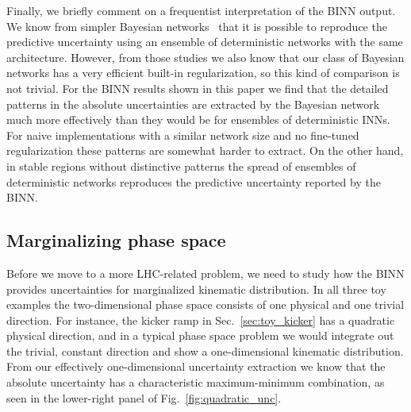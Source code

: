 Finally, we briefly comment on a frequentist interpretation of the
BINN output. We know from simpler Bayesian networks~\cite{Bollweg:2019skg,Kasieczka:2020vlh}
that it is possible to reproduce the predictive uncertainty using
an ensemble of deterministic networks with the same architecture.
However, from those studies we also know that our class of Bayesian
networks has a very efficient built-in regularization, so
this kind of comparison is not trivial. For the BINN results shown
in this paper we find that the detailed patterns in the
absolute uncertainties are extracted by the Bayesian network much more
effectively than they would be for ensembles of deterministic INNs.
For naive implementations with a similar network size and no fine-tuned
regularization these patterns are somewhat harder to extract. On the
other hand, in stable regions without distinctive patterns
the spread of ensembles of deterministic networks
reproduces the predictive uncertainty reported by the BINN.

\subsection{Marginalizing phase space}
\label{sec:toy_marginal}

Before we move to a more LHC-related problem, we need to study how the
BINN provides uncertainties for marginalized kinematic
distribution. In all three toy examples the two-dimensional phase
space consists of one physical and one trivial direction. For
instance, the kicker ramp in Sec.~\ref{sec:toy_kicker} has a quadratic
physical direction, and in a typical phase space problem we would
integrate out the trivial, constant direction and show a
one-dimensional kinematic distribution. From our effectively
one-dimensional uncertainty extraction we know that the absolute
uncertainty has a characteristic maximum-minimum combination, as seen
in the lower-right panel of Fig.~\ref{fig:quadratic_unc}.

